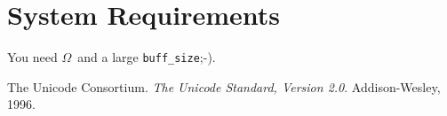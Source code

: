 \documentclass{article}
\def\oo{$\Omega$}
\begin{document}
\section{System Requirements}
You need \oo\ and a large {\selectfont
\verb|buff_size|;-)}.


\begin{thebibliography}{1}
  The Unicode Consortium.
  \newblock \emph{The Unicode Standard, Version 2.0}.
  \newblock Addison-Wesley, 1996.
\end{thebibliography}
\end{document}
